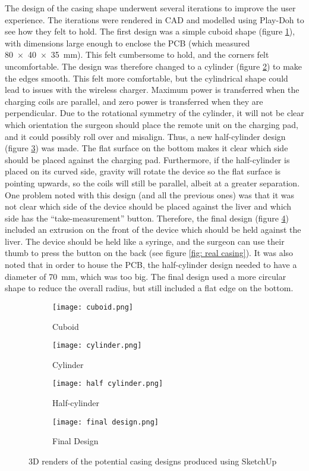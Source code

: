 The design of the casing shape underwent several iterations to improve the user experience. The iterations were rendered in CAD and modelled using Play-Doh to see how they felt to hold. The first design was a simple cuboid shape (figure \ref{fig: cuboid}), with dimensions large enough to enclose the PCB (which measured \SI{80x40x35}{\milli\metre}). This felt cumbersome to hold, and the corners felt uncomfortable. The design was therefore changed to a cylinder (figure \ref{fig: cylinder}) to make the edges smooth. This felt more comfortable, but the cylindrical shape could lead to issues with the wireless charger. Maximum power is transferred when the charging coils are parallel, and zero power is transferred when they are perpendicular. Due to the rotational symmetry of the cylinder, it will not be clear which orientation the surgeon should place the remote unit on the charging pad, and it could possibly roll over and misalign. Thus, a new half-cylinder design (figure \ref{fig: half-cylinder}) was made. The flat surface on the bottom makes it clear which side should be placed against the charging pad. Furthermore, if the half-cylinder is placed on its curved side, gravity will rotate the device so the flat surface is pointing upwards, so the coils will still be parallel, albeit at a greater separation. One problem noted with this design (and all the previous ones) was that it was not clear which side of the device should be placed against the liver and which side has the ``take-measurement'' button. Therefore, the final design (figure \ref{fig: final design}) included an extrusion on the front of the device which should be held against the liver. The device should be held like a syringe, and the surgeon can use their thumb to press the button on the back (see figure \ref{fig: real casing}). It was also noted that in order to house the PCB, the half-cylinder design needed to have a diameter of \SI{70}{\milli\metre}, which was too big. The final design used a more circular shape to reduce the overall radius, but still included a flat edge on the bottom.

\begin{figure}[htb]
	\centering
	\begin{subfigure}[b]{0.4\linewidth}
		\texttt{[image: cuboid.png]}
		\caption{Cuboid}
		\label{fig: cuboid}
	\end{subfigure}
	\begin{subfigure}[b]{0.4\linewidth}
		\texttt{[image: cylinder.png]}
		\caption{Cylinder}
		\label{fig: cylinder}
	\end{subfigure}
	\begin{subfigure}[b]{0.4\linewidth}
		\texttt{[image: half cylinder.png]}
		\caption{Half-cylinder}
		\label{fig: half-cylinder}
	\end{subfigure}
	\begin{subfigure}[b]{0.4\linewidth}
		\texttt{[image: final design.png]}
		\caption{Final Design}
		\label{fig: final design}
	\end{subfigure}
	\caption{3D renders of the potential casing designs produced using SketchUp \cite{sketchup}}
	\label{fig: casings}
\end{figure}


